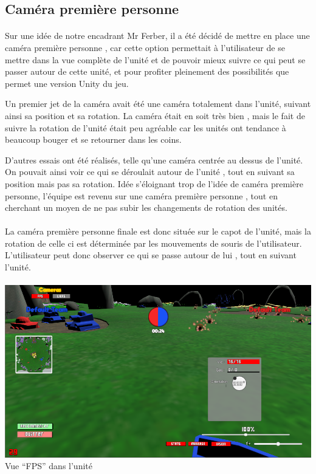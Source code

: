 \documentclass{report}
\begin{document}
\subsection{Caméra première personne}
\paragraph{}

Sur une idée de notre encadrant Mr Ferber, il a été décidé de mettre en place une caméra première personne , car cette option permettait à l’utilisateur de se mettre dans la vue complète de l’unité et de pouvoir mieux suivre ce qui peut se passer autour de cette unité, et pour profiter pleinement des possibilités que permet une version Unity du jeu. \newline

Un premier jet de la caméra avait été une caméra totalement dans l’unité, suivant ainsi sa position et sa rotation. La caméra était en soit très bien , mais le fait de suivre la rotation de l’unité était peu agréable car les unités ont tendance à beaucoup bouger et se retourner dans les coins. 

D’autres essais ont été réalisés, telle qu’une caméra centrée au dessus de l’unité. On pouvait ainsi voir ce qui se déroulait autour de l’unité , tout en suivant sa position mais pas sa rotation. Idée s’éloignant trop de l’idée de caméra première personne, l’équipe est revenu sur une caméra première personne , tout en cherchant un moyen de ne pas subir les changements de rotation des unités. 
\paragraph{}
La caméra première personne finale est donc située sur le capot de l’unité, mais la rotation de celle ci est déterminée par les mouvements de souris de l’utilisateur. L’utilisateur peut donc observer ce qui se passe autour de lui , tout en suivant l’unité. 

\paragraph{}
\begin{center}
\includegraphics[scale=0.6]{DATA/camerafps.png}
 {Vue “FPS” dans l’unité}
\end{center}
\end{document}
